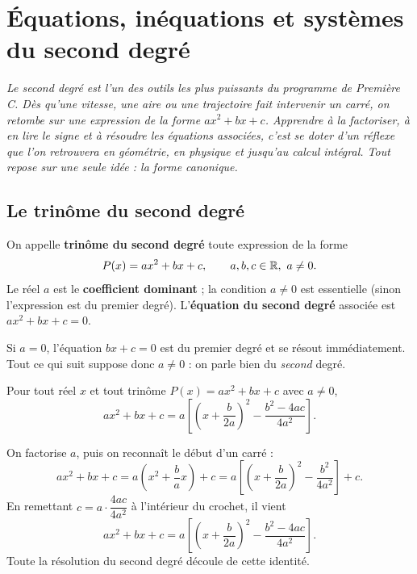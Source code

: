 \chapter{Équations, inéquations et systèmes du second degré}
\textit{Le second degré est l'un des outils les plus puissants du programme de
Première C. Dès qu'une vitesse, une aire ou une trajectoire fait intervenir un
carré, on retombe sur une expression de la forme $ax^2+bx+c$. Apprendre à la
factoriser, à en lire le signe et à résoudre les équations associées, c'est se
doter d'un réflexe que l'on retrouvera en géométrie, en physique et jusqu'au
calcul intégral. Tout repose sur une seule idée : la \emph{forme canonique}.}

\section{Le trinôme du second degré}

\begin{definition}
On appelle \textbf{trinôme du second degré} toute expression de la forme
\[ P(x)=ax^2+bx+c, \qquad a,b,c\in\mathbb{R},\ a\neq 0. \]
Le réel $a$ est le \textbf{coefficient dominant} ; la condition $a\neq 0$ est
essentielle (sinon l'expression est du premier degré). L'\textbf{équation du second
degré} associée est $ax^2+bx+c=0$.
\end{definition}

\begin{remarque}
Si $a=0$, l'équation $bx+c=0$ est du premier degré et se résout immédiatement.
Tout ce qui suit suppose donc $a\neq 0$ : on parle bien du \emph{second} degré.
\end{remarque}

\begin{theoreme}
Pour tout réel $x$ et tout trinôme $P(x)=ax^2+bx+c$ avec $a\neq 0$,
\[ ax^2+bx+c = a\!\left[\left(x+\frac{b}{2a}\right)^{\!2}-\frac{b^2-4ac}{4a^2}\right]. \]
\end{theoreme}

\begin{aretenir}
On factorise $a$, puis on reconnaît le début d'un carré :
\[ ax^2+bx+c = a\!\left(x^2+\frac{b}{a}x\right)+c
   = a\!\left[\left(x+\frac{b}{2a}\right)^{\!2}-\frac{b^2}{4a^2}\right]+c. \]
En remettant $c=a\cdot\dfrac{4ac}{4a^2}$ à l'intérieur du crochet, il vient
\[ ax^2+bx+c = a\!\left[\left(x+\frac{b}{2a}\right)^{\!2}-\frac{b^2-4ac}{4a^2}\right]. \]
Toute la résolution du second degré découle de cette identité.
\end{aretenir}


